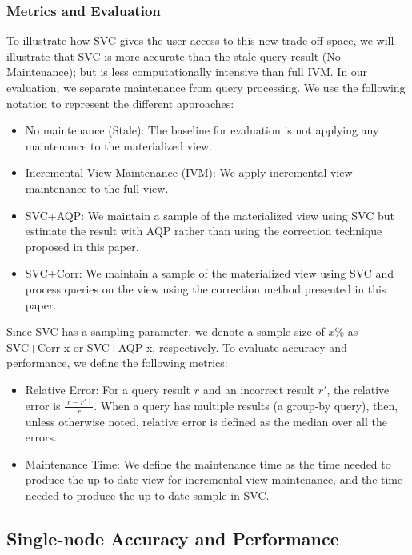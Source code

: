\subsubsection{Metrics and Evaluation}
To illustrate how SVC gives the user access to this new trade-off space, we will illustrate that SVC is more accurate than the stale query result (No Maintenance); but is less computationally intensive than full IVM. 
In our evaluation, we separate maintenance from query processing.
We use the following notation to represent the different approaches:
\begin{itemize}[noitemsep]
\item No maintenance (Stale): The baseline for evaluation is not applying any maintenance to the materialized view.
\item Incremental View Maintenance (IVM): We apply incremental view maintenance to the full view.
\item SVC+AQP: We maintain a sample of the materialized view using SVC but estimate the result with AQP rather than using 
the correction technique proposed in this paper.
\item SVC+Corr: We maintain a sample of the materialized view using SVC and process queries on the view using the correction method presented in this paper.
\end{itemize}
Since SVC has a sampling parameter, we denote a sample size of $x \% $ as SVC+Corr-x or SVC+AQP-x, respectively. 
To evaluate accuracy and performance, we define the following metrics:
\begin{itemize}[noitemsep]
\item Relative Error: For a query result $r$ and an incorrect result $r'$, the relative error is $\frac{\mid r-r' \mid}{r}.$
When a query has multiple results (a group-by query), then, unless otherwise noted, relative error is defined as the median over all the errors.
\item Maintenance Time: We define the maintenance time as the time needed to produce the up-to-date view for incremental view maintenance, and the time needed to produce the up-to-date sample in SVC. 
\end{itemize}

\subsection{Single-node Accuracy and Performance}
\vspace{-.5em}
